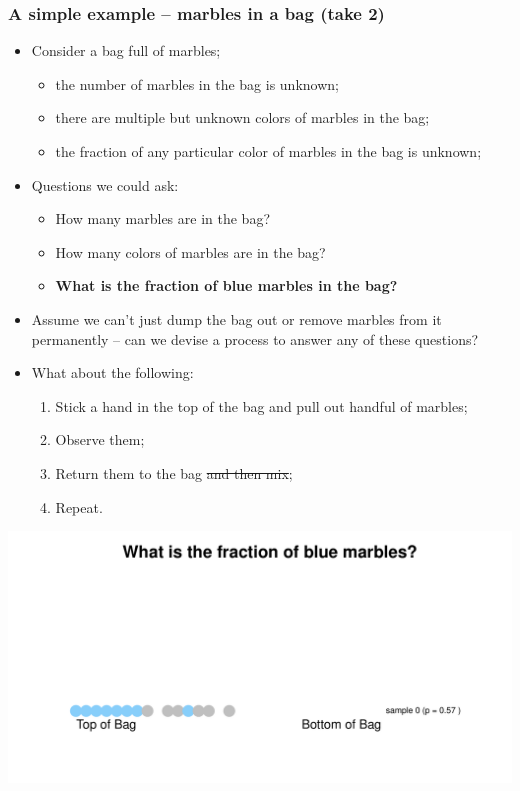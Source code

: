 \documentclass[aspectratio=169]{beamer}
\theoremstyle{principle}
\begin{document}
\begin{frame}
\frametitle{A simple example -- marbles in a bag (take 2)}

\begin{itemize}
\item Consider a bag full of marbles;
\begin{itemize}
\item the number of marbles in the bag is unknown;
\item there are multiple but unknown colors of marbles in the bag;
\item the fraction of any particular color of marbles in the bag is unknown;
\end{itemize}
\bigskip
\item Questions we could ask:
\begin{itemize}
\item How many marbles are in the bag?
\item How many colors of marbles are in the bag?
\item \textbf{What is the fraction of blue marbles in the bag?}
\end{itemize}
\bigskip
\item Assume we can't just dump the bag out or remove marbles from it permanently -- can we devise a process to answer any of these questions?
\bigskip
\item What about the following:
\begin{enumerate}
\item Stick a hand in the top of the bag and pull out handful of marbles;
\item Observe them;
\item Return them to the bag \sout{and then mix};
\item Repeat.
\end{enumerate} 
\end{itemize}

\end{frame}

\begin{frame}
\begin{center}
\includegraphics[scale=0.57]{bias_sample_0.pdf}
\end{center}
\end{frame}
\end{document}
